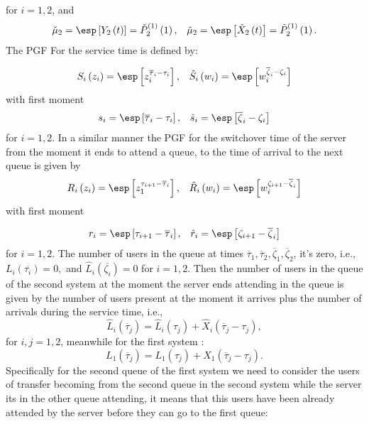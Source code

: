 for $i=1,2$, and
\begin{eqnarray*} 
\begin{array}{cc}
\check{\mu}_{2}=\esp\left[Y_{2}\left(t\right)\right]=\check{P}_{2}^{(1)}
\left(1\right),&
\tilde{\mu}_{2}=\esp\left[\tilde{X}_{2}\left(t\right)\right]
=\tilde{P}_{2}^{(1)}\left(1\right).
\end{array}
\end{eqnarray*} The PGF For the service time is defined by:

\begin{eqnarray*}
\begin{array}{cc}
S_{i}\left(z_{i}\right)=\esp\left[z_{i}^{\overline{\tau}_{i}-\tau_{i}}
\right], &
\hat{S}_{i}\left(w_{i}\right)=\esp\left[w_{i}^{\overline{\zeta}_{i}-\zeta_{i}}\right]
\end{array}
\end{eqnarray*} with first moment 
\begin{eqnarray*}
\begin{array}{cc}
s_{i}=\esp\left[\overline{\tau}_{i}-\tau_{i}\right],&\hat{s}_{i}=\esp\left[\overline{\zeta}_{i}-\zeta_{i}\right]
\end{array}
\end{eqnarray*} for $i=1,2$. In a similar manner the PGF for the switchover time of the server from the moment it ends to attend a queue, to the time of arrival to the next queue is given by 
\begin{eqnarray*}
\begin{array}{cc}
R_{i}\left(z_{i}\right)=\esp\left[z_{1}^{\tau_{i+1}-\overline{\tau}_{i}}\right],&
\hat{R}_{i}\left(w_{i}\right)=\esp\left[w_{i}^{\zeta_{i+1}-\overline{\zeta}_{i}}\right]
\end{array}
\end{eqnarray*} with first moment 

\begin{eqnarray*}
\begin{array}{cc}
r_{i}=\esp\left[\tau_{i+1}-\overline{\tau}_{i}\right],&
\hat{r}_{i}=\esp\left[\zeta_{i+1}-\overline{\zeta}_{i}\right]
\end{array}
\end{eqnarray*} for $i=1,2$. The number of users in the queue at times $\overline{\tau}_{1},\overline{\tau}_{2}, \overline{\zeta}_{1},\overline{\zeta}_{2}$, it's zero, i.e.,
 $L_{i}\left(\overline{\tau_{i}}\right)=0,$ and $\hat{L}_{i}\left(\overline{\zeta_{i}}\right)=0$ for $i=1,2$. Then the number of users in the queue of the second system at the moment the server ends attending in the queue is given by the number of users present at the moment it arrives plus the number of arrivals during the service time, i.e.,
$$\hat{L}_{i}\left(\overline{\tau}_{j}\right)=\hat{L}_{i}\left(\tau_{j}\right)+\hat{X}_{i}\left(\overline{\tau}_{j}-\tau_{j}\right),$$
for $i,j=1,2$, meanwhile for the first system : $$L_{1}\left(\overline{\tau}_{j}\right)=L_{1}\left(\tau_{j}\right)+X_{1}\left(\overline{\tau}_{j}-\tau_{j}\right).$$ Specifically for the second queue of the first system we need to consider the users of transfer becoming from the second queue in the second system while the server its in the other queue attending, it means that this users have been already attended by the server before they can go to the first queue:


